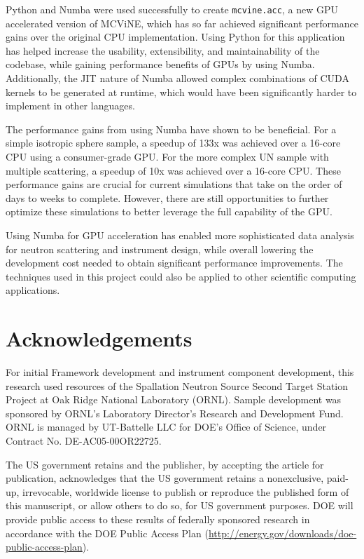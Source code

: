 Python and Numba were used successfully to create \texttt{mcvine.acc}, a new GPU accelerated version of MCViNE, which has so far achieved significant performance gains over the original CPU implementation. Using Python for this application has helped increase the usability, extensibility, and maintainability of the codebase, while gaining performance benefits of GPUs by using Numba. Additionally, the JIT nature of Numba allowed complex combinations of CUDA kernels to be generated at runtime, which would have been significantly harder to implement in other languages.

The performance gains from using Numba have shown to be beneficial. For a simple isotropic sphere sample, a speedup of 133x was achieved over a 16-core CPU using a consumer-grade GPU. For the more complex UN sample with multiple scattering, a speedup of 10x was achieved over a 16-core CPU. These performance gains are crucial for current simulations that take on the order of days to weeks to complete. However, there are still opportunities to further optimize these simulations to better leverage the full capability of the GPU. 

Using Numba for GPU acceleration has enabled more sophisticated data analysis for neutron scattering and instrument design, while overall lowering the development cost needed to obtain significant performance improvements. The techniques used in this project could also be applied to other scientific computing applications.


\section{Acknowledgements}
For initial Framework development and instrument component development, this research used resources of the Spallation Neutron Source Second Target Station Project at Oak Ridge National Laboratory (ORNL). Sample development was sponsored by ORNL's Laboratory Director's Research and Development Fund. ORNL is managed by UT-Battelle LLC for DOE’s Office of Science, under Contract No. DE-AC05-00OR22725.

The US government retains and the publisher, by accepting the article for publication, acknowledges that the US government retains a nonexclusive, paid-up, irrevocable, worldwide license to publish or reproduce the published form of this manuscript, or allow others to do so, for US government purposes. DOE will provide public access to these results of federally sponsored research in accordance with the DOE Public Access Plan (\url{http://energy.gov/downloads/doe-public-access-plan}).
